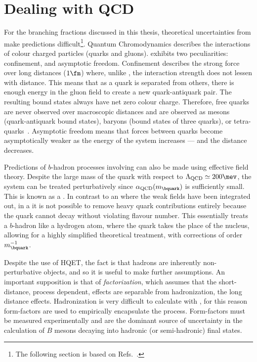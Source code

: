 \section{Dealing with QCD}

For the branching fractions discussed in this thesis, theoretical uncertainties from \QCD make
predictions difficult\footnote{
  The following section is based on Refs.~\cite{Pich:1998xt}.
}.
Quantum Chromodynamics describes the interactions of colour charged particles (quarks and
gluons).
\QCD exhibits two peculiarities: confinement, and asymptotic freedom.
Confinement describes the strong force over long distances (\approx$1\fm$)
where, unlike \QED, the interaction strength does not lessen with distance.
This means that as a quark is separated from others, there is enough energy in the gluon field to
create a new quark-antiquark pair.
The resulting bound states always have net zero colour charge.
Therefore, free quarks are never observed over macroscopic distances
and are observed as mesons (quark-antiquark bound states), baryons (bound states of
three quarks), or tetra-quarks~\cite{LHCb-PAPER-2014-014}.
Asymptotic freedom means that forces between quarks become asymptotically weaker as the energy of
the system increases --- and the distance decreases.

Predictions of $b$-hadron processes involving \QCD can also be made using effective field theory.
Despite the large mass of the \bquark quark with respect to $\Lambda_\mathrm{QCD}\simeq200\mev$,
the system can be treated perturbatively since $\alpha_\mathrm{QCD}(m_\bquark)$ is sufficiently
small.
This is known as a \HQET.
In contrast to an \EFT where the weak fields have been integrated out, in a \HQET
it is not possible to remove heavy quark contributions entirely because the \bquark quark
cannot decay without violating flavour number.
This essentially treats a $b$-hadron like a hydrogen atom, where the \bquark quark takes
the place of the nucleus, allowing for a highly simplified theoretical treatment, with corrections
of order $m_\bquark^{-1}$.

Despite the use of HQET, the fact is that hadrons are inherently non-perturbative objects, and so
it is useful to make further assumptions.
An important supposition is that of \emph{factorization}, which assumes that the short-distance,
process dependent, \QCD effects are separable from hadronization, the long distance effects.
Hadronization is very difficult to calculate with \QCD, for this reason form-factors are used to
empirically encapsulate the process.
Form-factors must be measured experimentally and are the dominant source of uncertainty in the
calculation of $B$ mesons decaying into hadronic (or semi-hadronic) final states.





